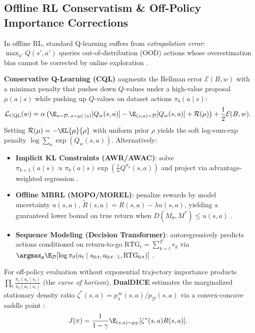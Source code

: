 \documentclass[../../../../master.tex]{subfiles}
\begin{document}
\subsection{Offline RL Conservatism \& Off-Policy Importance Corrections}
\label{sec:mbrl:offline}

In offline RL, standard Q-learning suffers from \emph{extrapolation error}: $\max_{a'} Q(s', a')$ queries out-of-distribution (OOD) actions whose overestimation bias cannot be corrected by online exploration .

\begin{coremath}
\textbf{Conservative Q-Learning (CQL)}  augments the Bellman error $\mathcal{E}(B, w)$ with a minimax penalty that pushes down $Q$-values under a high-value proposal $\mu(a \mid s)$ while pushing up $Q$-values on dataset actions $\pi_b(a \mid s)$:
\begin{equation}
\label{eq:mbrl:cql}
\mathcal{L}_{\text{CQL}}(w) = \alpha \left(\E_{s \sim \mathcal{D},\, a \sim \mu(\cdot \mid s)}[Q_w(s, a)] - \E_{(s,a) \sim \mathcal{D}}[Q_w(s, a)] + \mathcal{R}(\mu)\right) + \frac{1}{2}\mathcal{E}(B, w).
\end{equation}
Setting $\mathcal{R}(\mu) = -\KL{\mu}{\rho}$ with uniform prior $\rho$ yields the soft log-sum-exp penalty $\log \sum_a \exp(Q_w(s, a))$. Alternatively:
\begin{itemize}
  \item \textbf{Implicit KL Constraints (AWR/AWAC)}: solve $\pi_{k+1}(a \mid s) \propto \pi_b(a \mid s) \exp(\frac{1}{\alpha} Q^{\pi_k}(s, a))$ and project via advantage-weighted regression .
  \item \textbf{Offline MBRL (MOPO/MOREL)}: penalize rewards by model uncertainty $u(s, a)$, $\tilde{R}(s, a) = R(s, a) - \lambda u(s, a)$, yielding a guaranteed lower bound on true return when $D(M_\theta, M^*) \le u(s, a)$ .
  \item \textbf{Sequence Modeling (Decision Transformer)}: autoregressively predicts actions conditioned on return-to-go $\mathrm{RTG}_t = \sum_{k=t}^T r_k$ via $\argmax_\theta \E_{\mathcal{D}}[\log \pi_\theta(a_t \mid s_{0:t}, a_{0:t-1}, \mathrm{RTG}_{0:t})]$ .
\end{itemize}
For off-policy evaluation without exponential trajectory importance products $\prod_t \frac{\pi_e(a_t \mid s_t)}{\pi_b(a_t \mid s_t)}$ (the \emph{curse of horizon}), \textbf{DualDICE} estimates the marginalized stationary density ratio $\zeta^*(s, a) = p_\pi^\infty(s, a) / p_{\mathcal{D}}(s, a)$ via a convex-concave saddle point :
\begin{equation}
\label{eq:mbrl:dualdice}
J(\pi) = \frac{1}{1-\gamma}\E_{(s,a)\sim p_{\mathcal{D}}}[\zeta^*(s, a) R(s, a)].
\end{equation}
\end{coremath}
\end{document}
